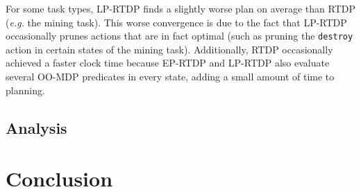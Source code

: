 \documentclass[11pt]{article}
\begin{document}
For some task types, LP-RTDP finds a slightly worse plan on average than
RTDP ({\em e.g.} the mining task). This worse convergence is due to the fact that LP-RTDP
occasionally prunes actions that are in fact optimal (such as
pruning the \texttt{destroy} action in certain states of the mining task).
Additionally, RTDP occasionally achieved a faster clock time because EP-RTDP and LP-RTDP also evaluate several OO-MDP predicates in every state, adding a small amount of time to planning.





\subsection{Analysis}


\section{Conclusion}



\end{document}
